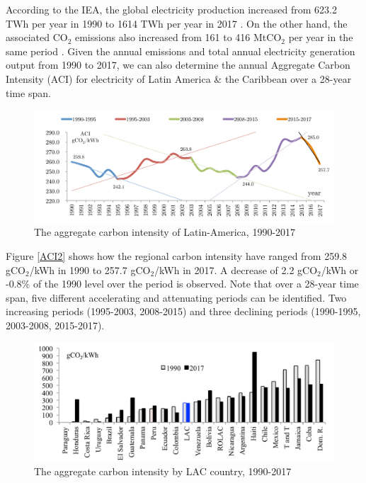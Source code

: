 \documentclass[energies,article,accept,moreauthors,12pt,a4paper]{mdpi} %
\begin{document}
According to the IEA, the global electricity production increased from 623.2 TWh per year in 1990 to 1614 TWh per year in 2017 \cite{IEAEnergyCombution2019}.  On the other hand, the associated CO$_2$ emissions also increased from 161 to 416 MtCO$_2$ per  year in the same period  \cite{IEAEnergyCombution2019}. Given the annual emissions and total annual electricity generation output from 1990 to 2017, we can also determine the annual Aggregate Carbon Intensity (ACI) for electricity of Latin America \& the Caribbean over a 28-year time span.


\begin{figure}[h!]
	\begin{center} 
	    \centering
		\includegraphics[width=13cm]{images/plot.pdf}
		\caption{The aggregate carbon intensity of Latin-America, 1990-2017} 
		\label{plot1}
		\end{center} 
\end{figure}


Figure \ref{ACI2} shows how the regional carbon intensity have ranged from 259.8 gCO$_2$/kWh in 1990 to 257.7  gCO$_2$/kWh in 2017. A
decrease of 2.2 gCO$_2$/kWh or -0.8\% of the 1990 level over the
period is observed. Note that over a 28-year time span,  five different accelerating and attenuating periods can be identified. Two increasing periods (1995-2003, 2008-2015) and three declining periods (1990-1995, 2003-2008, 2015-2017).


              \begin{figure}[ht] \centerline{
     \includegraphics[width=12cm]{images/ACIpercounry.pdf}}
       \caption{The aggregate carbon intensity by LAC country,  1990-2017}
      \label{ACIpercounry}
        \end{figure}
        
\end{document}
